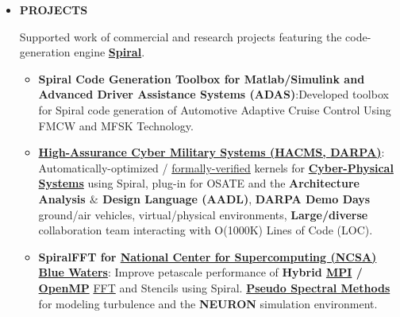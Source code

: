 \documentclass{article}
\begin{document}
    \begin{itemize}

      \item \textbf{PROJECTS}

      Supported work of commercial and research projects featuring the code-generation engine \textbf{\href{http://spiral.net/}{Spiral}}.

      \begin{itemize}

        \item \textbf{Spiral Code Generation Toolbox for Matlab/Simulink and Advanced Driver Assistance Systems (ADAS)}:Developed toolbox for Spiral code generation of Automotive Adaptive Cruise Control Using FMCW and MFSK Technology.

        \item \textbf{\href{http://www.darpa.mil/Our_Work/I2O/Programs/High-Assurance_Cyber_Military_Systems_(HACMS).aspx}{High-Assurance Cyber Military Systems (HACMS, \href{http://www.darpa.mil/default.aspx}{DARPA})}}: Automatically-optimized / \href{https://en.wikipedia.org/wiki/Formal_methods}{formally-verified} kernels for \textbf{\href{https://en.wikipedia.org/wiki/Cyber-physical_system}{Cyber-Physical Systems}} using Spiral, plug-in for OSATE and the \textbf{Architecture Analysis $\&$ Design Language (AADL)}, \textbf{DARPA Demo Days} ground/air vehicles, virtual/physical environments, \textbf{Large/diverse} collaboration team interacting with O(1000K) Lines of Code (LOC). 

      \item \textbf{SpiralFFT for \href{http://www.ncsa.illinois.edu}{National Center for Supercomputing  (NCSA)} \href{http://www.ncsa.illinois.edu/enabling/bluewaters}{Blue Waters}}: Improve petascale performance of \textbf{Hybrid \href{http://en.wikipedia.org/wiki/Message_Passing_Interface}{MPI} / \href{http://en.wikipedia.org/wiki/OpenMP}{OpenMP}} \href{https://en.wikipedia.org/wiki/Fast_Fourier_transform}{FFT} and Stencils using Spiral. \textbf{\href{https://en.wikipedia.org/wiki/Pseudo-spectral_method}{Pseudo Spectral Methods}} for modeling turbulence and the \textbf{NEURON} simulation environment. 


\end{itemize}
\end{itemize}
\end{document}
